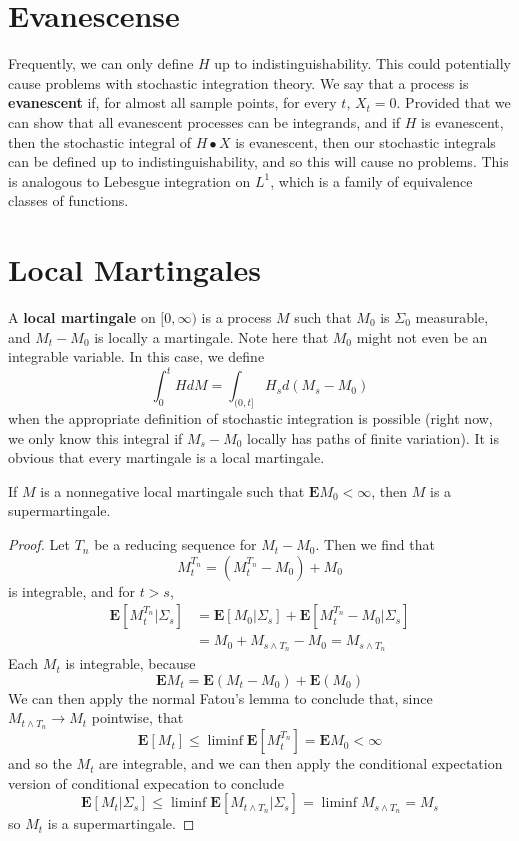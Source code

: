 \section{Evanescense}

Frequently, we can only define $H$ up to indistinguishability. This could potentially cause problems with stochastic integration theory. We say that a process is {\bf evanescent} if, for almost all sample points, for every $t$, $X_t = 0$. Provided that we can show that all evanescent processes can be integrands, and if $H$ is evanescent, then the stochastic integral of $H \bullet X$ is evanescent, then our stochastic integrals can be defined up to indistinguishability, and so this will cause no problems. This is analogous to Lebesgue integration on $L^1$, which is a family of equivalence classes of functions.

\section{Local Martingales}

A {\bf local martingale} on $[0,\infty)$ is a process $M$ such that $M_0$ is $\Sigma_0$ measurable, and $M_t - M_0$ is locally a martingale. Note here that $M_0$ might not even be an integrable variable. In this case, we define
%
\[ \int_0^t H dM = \int_{(0,t]} H_s d(M_s - M_0) \]
%
when the appropriate definition of stochastic integration is possible (right now, we only know this integral if $M_s - M_0$ locally has paths of finite variation). It is obvious that every martingale is a local martingale.

\begin{lemma}
    If $M$ is a nonnegative local martingale such that $\mathbf{E} M_0 < \infty$, then $M$ is a supermartingale.
\end{lemma}
\begin{proof}
    Let $T_n$ be a reducing sequence for $M_t - M_0$. Then we find that
    \[ M^{T_n}_t = (M^{T_n}_t - M_0) + M_0 \]
    is integrable, and for $t > s$,
    \begin{align*}
        \mathbf{E}[M^{T_n}_t | \Sigma_s] &= \mathbf{E}[M_0 | \Sigma_s] + \mathbf{E}[ M^{T_n}_t - M_0 | \Sigma_s ]\\
        &= M_0 + M_{s \wedge T_n} - M_0 = M_{s \wedge T_n}
    \end{align*}
    Each $M_t$ is integrable, because
    \[ \mathbf{E}M_t = \mathbf{E}(M_t - M_0) + \mathbf{E}(M_0) \]
    We can then apply the normal Fatou's lemma to conclude that, since $M_{t \wedge T_n} \to M_t$ pointwise, that
    \[ \mathbf{E}[M_t] \leq \liminf \mathbf{E}[M_t^{T_n}] = \mathbf{E}M_0 < \infty \]
    and so the $M_t$ are integrable, and we can then apply the conditional expectation version of conditional expecation to conclude
    \[ \mathbf{E}[M_t | \Sigma_s ] \leq \liminf \mathbf{E}[M_{t \wedge T_n} | \Sigma_s] = \liminf M_{s \wedge T_n} = M_s \]
    so $M_t$ is a supermartingale.
\end{proof}

